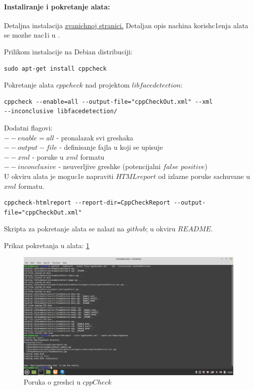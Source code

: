 \documentclass{article}
\begin{document}
\paragraph*{Instaliranje i pokretanje alata:}
Detaljna instalacija 
\href{https://cppcheck.sourceforge.io/}{zvanichnoj stranici.} 
Detaljan opis nachina korish\-c1enja alata se mozhe nac1i u \cite{cppCheckMan}.

Prilikom instalacije na Debian distribuciji:
\selectfont
\begin{verbatim}
sudo apt-get install cppcheck
\end{verbatim}

\selectfont
Pokretanje alata $cppcheck$ nad projektom $libfacedetection$: 

\selectfont
\begin{verbatim}
cppcheck --enable=all --output-file="cppCheckOut.xml" --xml
--inconclusive libfacedetection/
\end{verbatim}

\selectfont
Dodatni flagovi:\\
$--enable = all$ - pronalazak svi greshaka \\
$--output-file$ - definisanje fajla u koji se upisuje \\
$--xml$ - poruke u $xml$ formatu \\
$--inconclusive$ - neuverljive greshke (potencijalni $false$ $positive$)
\\
U okviru alata je moguc1e napraviti $HTML report$ od izlazne poruke sachuvane u $xml$ formatu. 

\selectfont
\begin{verbatim}
cppcheck-htmlreport --report-dir=CppCheckReport --output-file="cppCheckOut.xml" 
\end{verbatim}

\selectfont

Skripta za pokretanje alata se nalazi na $github$; u okviru $README$.

Prikaz pokretanja u alata: \ref{msg:cppcheck}

\begin{figure}[H]
    \centering
    \includegraphics[width=12cm]{img/cppCheck/cppCheckTerminal.png}
    \caption{Poruka o gresh\-ci u $cppCheck$}
    \label{msg:cppcheck}
\end{figure}
\end{document}
